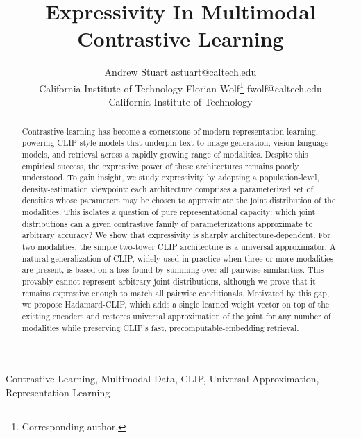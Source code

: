 \documentclass{article}
\begin{document}
\title{Expressivity In
 Multimodal Contrastive Learning}

\author{%
 \name Andrew Stuart \email
 astuart@caltech.edu \\ \addr California Institute of Technology \AND \name
 Florian Wolf\thanks{Corresponding author.} \email fwolf@caltech.edu \\
 \addr California Institute of Technology }


\maketitle

\begin{abstract}
 Contrastive learning has become a cornerstone of modern representation
 learning, powering CLIP-style models that underpin text-to-image generation,
 vision-language models, and retrieval across a rapidly growing range of
 modalities. Despite this empirical success, the expressive power of these
 architectures remains poorly understood. To gain insight, we study
 expressivity by adopting a population-level, density-estimation viewpoint:
 each architecture comprises a parameterized set of densities whose
 parameters may be chosen to approximate the joint distribution of the
 modalities. This isolates a question of pure representational capacity: which joint
 distributions can a given contrastive family of parameterizations approximate
 to arbitrary accuracy? We show that expressivity is sharply architecture-dependent.
 For two modalities,
 the simple two-tower CLIP architecture is a universal approximator.
 A natural generalization of CLIP, widely used in practice when
 three or more modalities are present, is based on a loss found by summing
 over all pairwise similarities. This provably cannot represent arbitrary
 joint distributions, although we prove that it remains expressive enough to match all
 pairwise conditionals. Motivated by this gap, we propose Hadamard-CLIP,
 which adds a single learned weight vector on top of the existing encoders
 and restores universal approximation of the joint for any number of
 modalities while preserving CLIP's fast, precomputable-embedding retrieval.
\end{abstract}

\begin{keywords}
 Contrastive Learning, Multimodal Data, CLIP, Universal Approximation,
 Representation Learning
\end{keywords}
\end{document}
